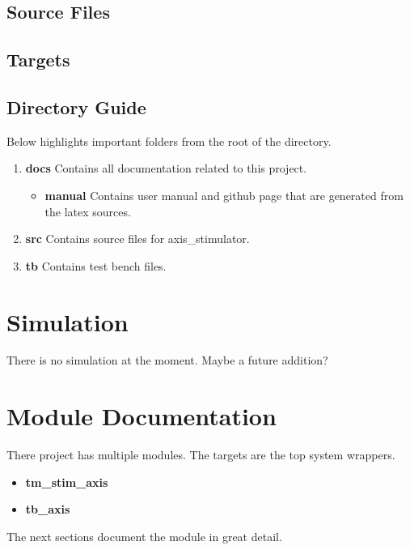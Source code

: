 \subsection{Source Files}



\subsection{Targets} \label{targets}



\subsection{Directory Guide}

\par
Below highlights important folders from the root of the directory.

\begin{enumerate}
  \item \textbf{docs} Contains all documentation related to this project.
    \begin{itemize}
      \item \textbf{manual} Contains user manual and github page that are generated from the latex sources.
    \end{itemize}
  \item \textbf{src} Contains source files for axis\_stimulator.
  \item \textbf{tb} Contains test bench files.
\end{enumerate}

\newpage

\section{Simulation}
\par
There is no simulation at the moment. Maybe a future addition?

\newpage

\section{Module Documentation} \label{Module Documentation}

\par
There project has multiple modules. The targets are the top system wrappers.

\begin{itemize}
\item \textbf{tm\_stim\_axis}
\item \textbf{tb\_axis}
\end{itemize}
The next sections document the module in great detail.

